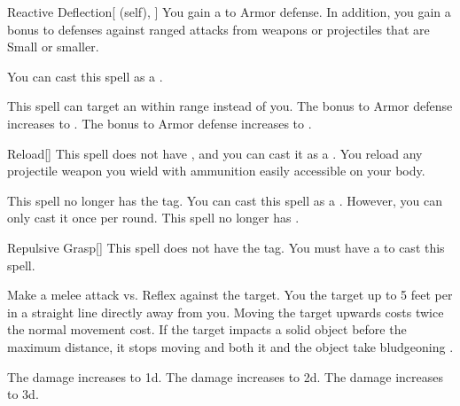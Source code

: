 \lowercase{\hypertarget{spell:Reactive Deflection}{}}\label{spell:Reactive Deflection}
\begin{attuneability}[Rank 2]{\hypertarget{spell:Reactive Deflection}{Reactive Deflection}}[ (self), ]
You gain a   to Armor defense.
In addition, you gain a  bonus to defenses against  ranged attacks from weapons or projectiles that are Small or smaller.

You can cast this spell as a .

\rankline
{} This spell can target an  within \rngmed range instead of you.
 The bonus to Armor defense increases to .
 The bonus to Armor defense increases to .

\end{attuneability}
\vspace{0.25em}



\lowercase{\hypertarget{spell:Reload}{}}\label{spell:Reload}
\begin{freeability}[Rank 2]{\hypertarget{spell:Reload}{Reload}}[]
This spell does not have , and you can cast it as a .
You reload any projectile weapon you wield with ammunition easily accessible on your body.

\rankline
{} This spell no longer has the  tag.
 You can cast this spell as a .
However, you can only cast it once per round.
 This spell no longer has .

\end{freeability}
\vspace{0.25em}



\lowercase{\hypertarget{spell:Repulsive Grasp}{}}\label{spell:Repulsive Grasp}
\begin{freeability}[Rank 2]{\hypertarget{spell:Repulsive Grasp}{Repulsive Grasp}}[]
This spell does not have the  tag.
You must have a  to cast this spell.

Make a melee attack vs. Reflex against the target.
\hit You  the target up to 5 feet per  in a straight line directly away from you.
Moving the target upwards costs twice the normal movement cost.
If the target impacts a solid object before the maximum distance, it stops moving and both it and the object take bludgeoning .

\rankline
{} The damage increases to  \plus1d.
 The damage increases to  \plus2d.
 The damage increases to  \plus3d.

\end{freeability}
\vspace{0.25em}



